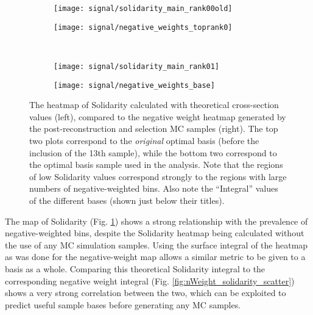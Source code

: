     \begin{figure}[tbh]
    	\centering
        \begin{subfigure}{0.48\textwidth}
            \texttt{[image: signal/solidarity\_main\_rank00old]}
            \captionsetup{justification=centering} \caption{}
        \end{subfigure}
        \begin{subfigure}{0.48\textwidth}
            \texttt{[image: signal/negative\_weights\_toprank0]}
            \captionsetup{justification=centering} \caption{}
        \end{subfigure}
        \\
        \begin{subfigure}{0.48\textwidth}
            \texttt{[image: signal/solidarity\_main\_rank01]}
            \captionsetup{justification=centering} \caption{}
        \end{subfigure}
        \begin{subfigure}{0.5\textwidth}
            \texttt{[image: signal/negative\_weights\_base]}
            \captionsetup{justification=centering} \caption{}
        \end{subfigure}
        \caption{
            The heatmap of Solidarity calculated with theoretical cross-section values (left),
                compared to the negative weight heatmap generated by the post-reconstruction and selection MC samples (right).
            The top two plots correspond to the \textit{original} optimal basis (before the inclusion of the 13th sample),
                while the bottom two correspond to the optimal basis sample used in the analysis.
            Note that the regions of low Solidarity values correspond strongly to the regions with large numbers of negative-weighted bins.
            Also note the ``Integral'' values of the different bases (shown just below their titles).
        }
        \label{fig:solidarity_heatmaps}
    \end{figure}
    \FloatBarrier

    The map of Solidarity (Fig. \ref{fig:solidarity_heatmaps}) shows a strong relationship with the prevalence of negative-weighted bins,
        despite the Solidarity heatmap being calculated without the use of any MC simulation samples.
    Using the surface integral of the heatmap as was done for the negative-weight map allows a similar metric to be given to a basis as a whole.
    Comparing this theoretical Solidarity integral to the corresponding negative weight integral (Fig. \ref{fig:nWeight_solidarity_scatter})
        shows a very strong correlation between the two,
        which can be exploited to predict useful sample bases before generating any MC samples.

